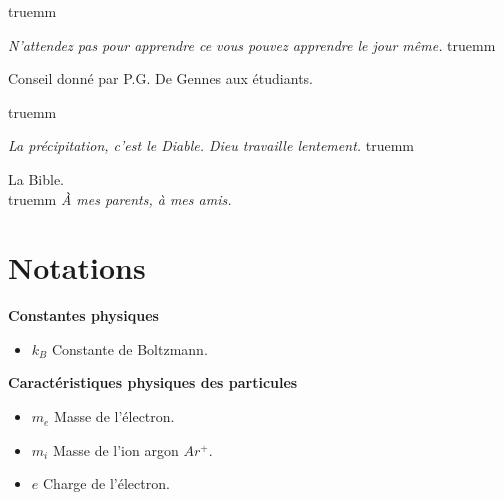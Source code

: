 \documentclass{book}
\begin{document}
\tableofcontents



\newpage
\thispagestyle{empty}
\null
\vspace{20mm}

\hspace{30mm}\begin{minipage}{130mm}

 truemm

{\it N'attendez pas pour apprendre ce vous pouvez apprendre le jour
m\^eme.} 
 truemm


{\small Conseil donn\'e par P.G. De Gennes aux \'etudiants.}\\

\vspace {3mm}

 truemm

{\it La pr\'ecipitation, c'est le Diable. Dieu travaille lentement.}
 truemm 


{\small La Bible.}\\

 truemm
\vspace{50mm}
{\it \`A mes parents, \`a mes amis.}

\end{minipage}



\chapter*{Notations}
{\bf Constantes physiques}
\begin{itemize}
\item $k_B$ Constante de Boltzmann.
\end{itemize}

{\bf Caract\'eristiques physiques des particules}
\begin{itemize}
\item $m_e$ Masse de l'\'electron.
\item $m_i$ Masse de l'ion argon $Ar^+$.
\item $e$ Charge de l'\'electron.
\end{itemize}
\end{document}

